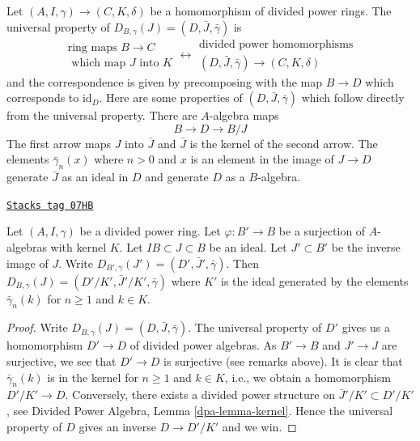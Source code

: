 Let $(A, I, \gamma) \to (C, K, \delta)$ be a homomorphism of divided
power rings. The universal property of
$D_{B, \gamma}(J) = (D, \bar J, \bar \gamma)$ is
$$
\begin{matrix}
\text{ring maps }B \to C \\
\text{ which map }J\text{ into }K
\end{matrix}
\longleftrightarrow
\begin{matrix}
\text{divided power homomorphisms} \\
(D, \bar J, \bar \gamma) \to (C, K, \delta)
\end{matrix}
$$
and the correspondence is given by precomposing with the map $B \to D$
which corresponds to $\text{id}_D$. Here are some properties of
$(D, \bar J, \bar \gamma)$ which follow directly from the universal
property. There are $A$-algebra maps
\begin{equation}
\label{equation-divided-power-envelope}
B \longrightarrow D \longrightarrow B/J
\end{equation}
The first arrow maps $J$ into $\bar J$ and $\bar J$ is the kernel
of the second arrow. The elements $\bar\gamma_n(x)$ where $n > 0$
and $x$ is an element in the image of $J \to D$ generate $\bar J$
as an ideal in $D$ and generate $D$ as a $B$-algebra.

\begin{lemma}
\label{crystalline-lemma-divided-power-envelop-quotient}
\href{https://stacks.math.columbia.edu/tag/07HB}{\texttt{Stacks tag 07HB}}

Let $(A, I, \gamma)$ be a divided power ring.
Let $\varphi : B' \to B$ be a surjection of $A$-algebras with kernel $K$.
Let $IB \subset J \subset B$ be an ideal. Let $J' \subset B'$
be the inverse image of $J$. Write
$D_{B', \gamma}(J') = (D', \bar J', \bar\gamma)$.
Then $D_{B, \gamma}(J) = (D'/K', \bar J'/K', \bar\gamma)$
where $K'$ is the ideal generated by the elements $\bar\gamma_n(k)$
for $n \geq 1$ and $k \in K$.
\end{lemma}

\begin{proof}
Write $D_{B, \gamma}(J) = (D, \bar J, \bar \gamma)$.
The universal property of $D'$ gives us a homomorphism $D' \to D$
of divided power algebras. As $B' \to B$ and $J' \to J$ are surjective, we
see that $D' \to D$ is surjective (see remarks above). It is clear that
$\bar\gamma_n(k)$ is in the kernel for $n \geq 1$ and $k \in K$, i.e.,
we obtain a homomorphism $D'/K' \to D$. Conversely, there exists a divided
power structure on $\bar J'/K' \subset D'/K'$, see
Divided Power Algebra, Lemma \ref{dpa-lemma-kernel}.
Hence the universal property of $D$ gives an inverse $D \to D'/K'$ and we win.
\end{proof}

